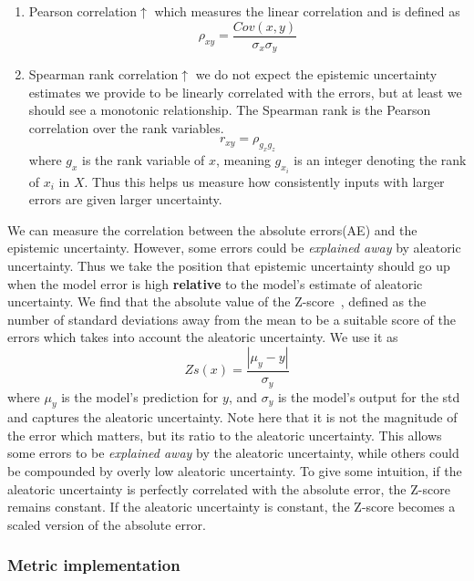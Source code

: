 \documentclass[../main.tex]{subfiles}
\begin{document}
\begin{enumerate}
    \item  Pearson correlation$\uparrow$ which measures the linear correlation and is defined as
    \begin{equation}
        \rho_{xy} =  \frac{Cov(x,y)}{\sigma_x \sigma_y}
    \end{equation}{}
    
    \item Spearman rank correlation$\uparrow$ we do not expect the epistemic uncertainty estimates we provide to be linearly correlated with the errors, but at least we should see a monotonic relationship. The Spearman rank is the Pearson correlation over the rank variables.
    \begin{equation}
        r_{xy} = \rho_{g_x g_z}
    \end{equation}{}
    where $g_x$ is the rank variable of $x$, meaning $g_{x_i}$ is an integer denoting the rank of $x_i$ in $X$. Thus this helps us measure how consistently inputs with larger errors are given larger uncertainty. 
\end{enumerate}{}

We can measure the correlation between the absolute errors(AE) and the epistemic uncertainty. However, some errors could be \emph{explained away} by aleatoric uncertainty. Thus we take the position that epistemic uncertainty should go up when the model error is high \textbf{relative} to the model's estimate of aleatoric uncertainty. 
We find that the absolute value of the Z-score~\citep{clark2014z}, defined as the number of standard deviations away from the mean to be a suitable score of the errors which takes into account the aleatoric uncertainty. We use it as 
$$ Zs(x) = \frac{|\mu_y - y|}{\sigma_y}$$
where $\mu_y$ is the model's prediction for $y$, and $\sigma_y$ is the model's output for the std and captures the aleatoric uncertainty. Note here that it is not the magnitude of the error which matters, but its ratio to the aleatoric uncertainty. This allows some errors to be \emph{explained away} by the aleatoric uncertainty, while others could be compounded by overly low aleatoric uncertainty. To give some intuition, if the aleatoric uncertainty is perfectly correlated with the absolute error, the Z-score remains constant. If the aleatoric uncertainty is constant, the Z-score becomes a scaled version of the absolute error. 


\subsubsection{Metric implementation}
\end{document}
